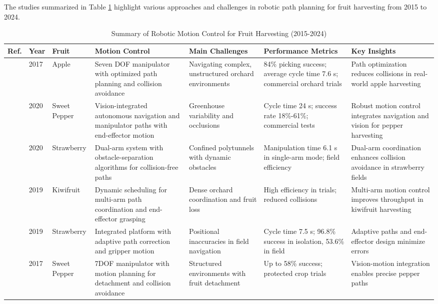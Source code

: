 \documentclass{ieeeaccess}
\begin{document}
The studies summarized in Table \ref{tab:motion-control-based} highlight various approaches and challenges in robotic path planning for fruit harvesting from 2015 to 2024.
\iffalse
\begin{table}[htbp]
\centering
\small
\renewcommand{\arraystretch}{1.2}
\caption{Summary of Robotic Motion Control for Fruit Harvesting (2015-2024)}
\label{tab:motion-control-based}
\begin{tabular}{p{} p{} p{} p{} p{} p{} p{}}
\toprule
\textbf{Ref.} & \textbf{Year} & \textbf{Fruit} & \textbf{Motion Control} & \textbf{Main Challenges} & \textbf{Performance Metrics} & \textbf{Key Insights} \\ \midrule
\cite{silwal2017design} & 2017 & Apple & Seven DOF manipulator with optimized path planning and collision avoidance & Navigating complex, unstructured orchard environments & 84\% picking success; average cycle time 7.6 s; commercial orchard trials & Path optimization reduces collisions in real-world apple harvesting \\ \midrule
\cite{arad2020development} & 2020 & Sweet Pepper & Vision-integrated autonomous navigation and manipulator paths with end-effector motion & Greenhouse variability and occlusions & Cycle time 24 s; success rate 18\%-61\%; commercial tests & Robust motion control integrates navigation and vision for pepper harvesting \\ \midrule
\cite{xiong2020autonomous} & 2020 & Strawberry & Dual-arm system with obstacle-separation algorithms for collision-free paths & Confined polytunnels with dynamic obstacles & Manipulation time 6.1 s in single-arm mode; field efficiency & Dual-arm coordination enhances collision avoidance in strawberry fields \\ \midrule
\cite{williams2019robotic} & 2019 & Kiwifruit & Dynamic scheduling for multi-arm path coordination and end-effector grasping & Dense orchard coordination and fruit loss & High efficiency in trials; reduced collisions & Multi-arm motion control improves throughput in kiwifruit harvesting \\ \midrule
\cite{xiong2019development} & 2019 & Strawberry & Integrated platform with adaptive path correction and gripper motion & Positional inaccuracies in field navigation & Cycle time 7.5 s; 96.8\% success in isolation, 53.6\% in field & Adaptive paths and end-effector design minimize errors \\ \midrule
\cite{lehnert2017autonomous} & 2017 & Sweet Pepper & 7DOF manipulator with motion planning for detachment and collision avoidance & Structured environments with fruit detachment & Up to 58\% success; protected crop trials & Vision-motion integration enables precise pepper paths \\ \midrule

\end{tabular}
\end{table}
\end{document}
